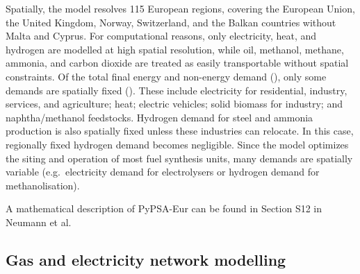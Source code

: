 Spatially, the model resolves 115 European
regions,\cite{frysztackiStrongEffect2021} covering the European Union, the
United Kingdom, Norway, Switzerland, and the Balkan countries without Malta and
Cyprus. For computational reasons, only electricity, heat, and hydrogen are
modelled at high spatial resolution, while oil, methanol, methane, ammonia, and
carbon dioxide are treated as easily transportable without spatial constraints.
Of the total final energy and non-energy demand
(), only some demands are spatially fixed
(). These include electricity for residential, industry,
services, and agriculture; heat; electric vehicles; solid biomass for industry;
and naphtha/methanol feedstocks. Hydrogen demand for steel and ammonia
production is also spatially fixed unless these industries can relocate. In this
case, regionally fixed hydrogen demand becomes negligible. Since the model
optimizes the siting and operation of most fuel synthesis units, many demands
are spatially variable (e.g.~electricity demand for electrolysers or hydrogen
demand for methanolisation).

A mathematical description of PyPSA-Eur can be found in Section S12 in Neumann
et al.\cite{neumannPotentialRoleHydrogen2023}

\subsection*{Gas and electricity network modelling}

